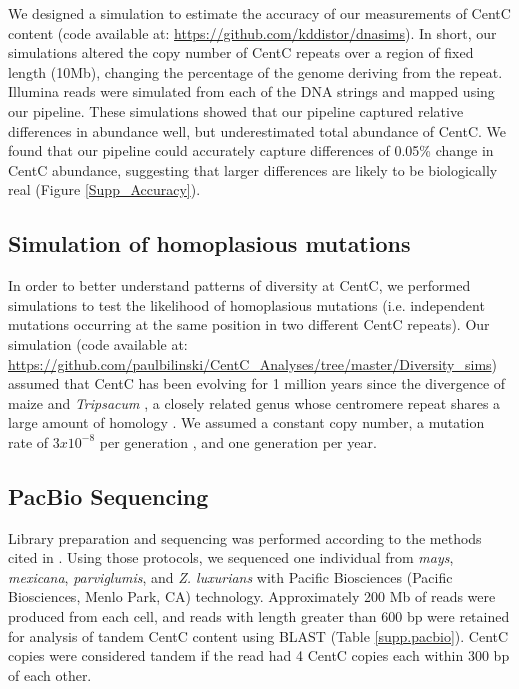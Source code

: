 We designed a simulation to estimate the accuracy of our measurements of CentC content (code available at: \url{https://github.com/kddistor/dnasims}).  
In short, our simulations altered the copy number of CentC repeats over a region of fixed length (10Mb), changing the percentage of the genome deriving from the repeat.  
Illumina reads were simulated from each of the DNA strings and mapped using our pipeline.  These simulations showed that our pipeline captured relative differences in abundance well, but underestimated total abundance of CentC.  
We found that our pipeline could accurately capture differences of 0.05\% change in CentC abundance, suggesting that larger differences are likely to be biologically real (Figure \ref{Supp_Accuracy}).  

\subsection*{Simulation of homoplasious mutations}

In order to better understand patterns of diversity at CentC, we performed simulations to test the likelihood of homoplasious mutations (i.e. independent mutations occurring at the same position in two different CentC repeats). 
Our simulation (code available at: \url{https://github.com/paulbilinski/CentC_Analyses/tree/master/Diversity_sims}) assumed that CentC has been evolving for 1 million years since the divergence of maize and \emph{Tripsacum} \citep{Ross-Ibarra2009}, a closely related genus whose centromere repeat shares a large amount of homology \citep{Melters2012}.  
We assumed a constant copy number, a mutation rate of $3 x 10^{-8}$ per generation \citep{clark2005estimating}, and one generation per year.  

\subsection*{PacBio Sequencing}
	
Library preparation and sequencing was performed according to the methods cited in \citep{Melters2012}.  
Using those protocols, we sequenced one individual from \emph{mays}, \emph{mexicana}, \emph{parviglumis}, and \emph{Z. luxurians} with Pacific Biosciences (Pacific Biosciences, Menlo Park, CA) technology. 
Approximately 200 Mb of reads were produced from each cell, and reads with length greater than 600 bp were retained for analysis of tandem CentC content using BLAST (Table \ref{supp.pacbio}).  
CentC copies were considered tandem if the read had 4 CentC copies each within 300 bp of each other. 

